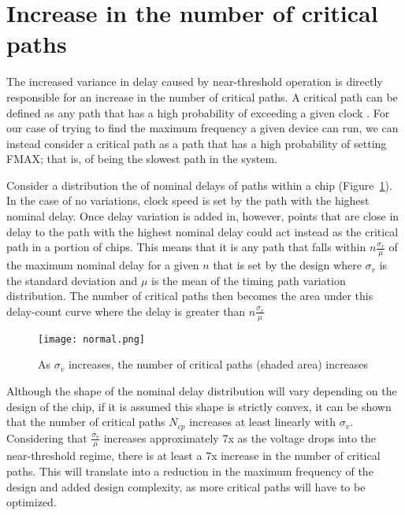 \section{Increase in the number of critical paths}
\label{sec:criticalpaths}

The increased variance in delay caused by near-threshold operation is directly responsible for an increase in the number of critical paths.
A critical path can be defined as any path that has a high probability of exceeding a given clock \cite{Wang:2004bw}.
For our case of trying to find the maximum frequency a given device can run, we can instead consider a critical path as a path that has a high probability of setting FMAX; that is, of being the slowest path in the system.
  
Consider a distribution the of nominal delays of paths within a chip (Figure~\ref{fig:normal}).
In the case of no variations, clock speed is set by the path with the highest nominal delay.
Once delay variation is added in, however, points that are close in delay to the path with the highest nominal delay could act instead as the critical path in a portion of chips.
This means that it is any path that falls within $n\frac{\sigma_v}{\mu}$ of the maximum nominal delay for a given $n$ that is set by the design where $\sigma_v$ is the standard deviation and $\mu$ is the mean of the timing path variation distribution.
The number of critical paths then becomes the area under this delay-count curve where the delay is greater than $n\frac{\sigma_v}{\mu}$
 
\begin{figure}[thpb]
    \centering
    \texttt{[image: normal.png]}
    \caption{As $\sigma_v$ increases, the number of critical paths (shaded area) increases}
    \label{fig:normal}
\end{figure}
 
 Although the shape of the nominal delay distribution will vary depending on the design of the chip, if it is assumed this shape is strictly convex, it can be shown that the number of critical paths $N_{cp}$ increases at least linearly with $\sigma_v$.
Considering that $\frac{\sigma_v}{\mu}$ increases approximately 7x as the voltage drops into the near-threshold regime, there is at least a 7x increase in the number of critical paths.
This will translate into a reduction in the maximum frequency of the design\cite{Bowman:2002cp} and added design complexity, as more critical paths will have to be optimized.


